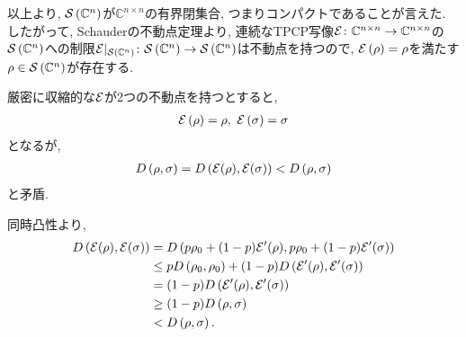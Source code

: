 \begin{ex}
    以上より, $\mathcal{S}\left({\mathbb{C}^{n}}\right)$が$\mathbb{C}^{n \times n}$の有界閉集合, つまりコンパクトであることが言えた. したがって, Schauderの不動点定理より, 連続なTPCP写像$\mathcal{E} \colon \mathbb{C}^{n \times n} \to \mathbb{C}^{n \times n}$の$\mathcal{S}\left({\mathbb{C}^n}\right)$への制限$\mathcal{E}|_{\mathcal{S}\left({\mathbb{C}^n}\right)} \colon \mathcal{S}\left({\mathbb{C}^n}\right) \to \mathcal{S}\left({\mathbb{C}^n}\right)$は不動点を持つので, $\mathcal{E} \left(\rho\right) = \rho$を満たす$\rho \in \mathcal{S}\left({\mathbb{C}^n}\right)$が存在する.
\end{ex}

\begin{ex}
    \label{ex9.10}
    厳密に収縮的な$\mathcal{E}$が2つの不動点を持つとすると,
    \begin{align*}
        \mathcal{E} \left( \rho\right) = \rho, \ \mathcal{E} \left( \sigma\right) = \sigma
    \end{align*}
    となるが,
    \begin{align*}
        D \left( \rho , \sigma\right)
        =
        D \left( \mathcal{E}(\rho) , \mathcal{E}(\sigma)\right)
        <
        D \left( \rho , \sigma\right)
    \end{align*}
    と矛盾.
\end{ex}

\begin{ex}
    \label{ex9.11}
    同時凸性より,
    \begin{align*}
        D \left( \mathcal{E}(\rho), \mathcal{E}(\sigma)\right)
         & =
        D\left( p \rho_0 + (1-p)\mathcal{E}'(\rho), p \rho_0 + (1-p)\mathcal{E}'(\sigma) \right)
        \\
         & \leq
        p D \left( \rho_0, \rho_0\right)
        +
        (1-p) D \left( \mathcal{E}'(\rho), \mathcal{E}'(\sigma)\right)
        \\
         & =
        (1-p) D \left( \mathcal{E}'(\rho), \mathcal{E}'(\sigma)\right)
        \\
         & \geq(1-p)D\left( \rho, \sigma\right)
        \\
         & < D \left( \rho, \sigma\right).
    \end{align*}
\end{ex}

